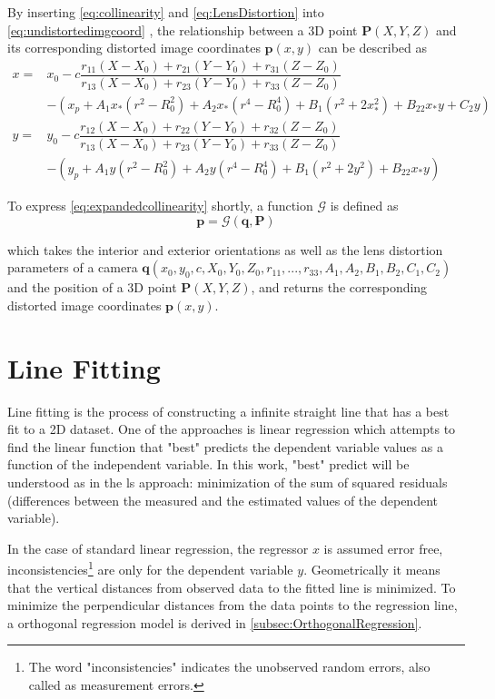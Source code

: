 By inserting \eqref{eq:collinearity} and \eqref{eq:LensDistortion} into \eqref{eq:undistortedimgcoord} , the relationship between a 3D point $\mathbf{P}(X, Y, Z)$ and its corresponding distorted image coordinates $\mathbf{p}(x,y)$ can be described as
\begin{equation} \label{eq:expandedcollinearity}
\begin{split}
x =& x_0-c\dfrac{r_{11}(X-X_0)+r_{21}(Y-Y_0)+r_{31}(Z-Z_0)}{r_{13}(X-X_0)+r_{23}(Y-Y_0)+r_{33}(Z-Z_0)} \\
&-(x_p + A_1x_*(r^2-R_0^2) + A_2x_*(r^4-R_0^4) + B_1(r^2+2x_*^2) + B_22x_*y+C_2y)\\
y =& y_0-c\dfrac{r_{12}(X-X_0)+r_{22}(Y-Y_0)+r_{32}(Z-Z_0)}{r_{13}(X-X_0)+r_{23}(Y-Y_0)+r_{33}(Z-Z_0)} \\
&-(y_p + A_1y  (r^2-R_0^2) + A_2y  (r^4-R_0^4) + B_1(r^2+2y^2)   + B_22x_*y)
\end{split}
\end{equation}

To express \eqref{eq:expandedcollinearity} shortly, a function $\mathcal{G}$ is defined as
\begin{equation} \label{eq:Gfunction}
\mathbf{p} = \mathcal{G}(\mathbf{q},\mathbf{P}) 
\end{equation}

which takes the interior and exterior orientations as well as the lens distortion parameters of a camera $\mathbf{q}(x_0,y_0,c,X_0,Y_0,Z_0,r_{11},...,r_{33},A_1,A_2,B_1,B_2,C_1,C_2)$ and the position of a 3D point $\mathbf{P}(X, Y, Z)$, and returns the corresponding distorted image coordinates $\mathbf{p}(x,y)$.


\section{Line Fitting}
\label{sec:LineFitting}

Line fitting is the process of constructing a infinite straight line that has a best fit to a 2D dataset. One of the approaches is linear regression which attempts to find the linear function that "best" predicts the dependent variable values as a function of the independent variable. In this work, "best" predict will be understood as in the \gls{ls} approach: minimization of the sum of squared residuals (differences between the measured and the estimated values of the dependent variable).

In the case of standard linear regression, the regressor $x$ is assumed error free, inconsistencies\footnote{The word "inconsistencies" indicates the unobserved random errors, also called as measurement errors.} are only for the dependent variable $y$. Geometrically it means that the vertical distances from observed data to the fitted line is minimized. To minimize the perpendicular distances from the data points to the regression line, a orthogonal regression model is derived in \cref{subsec:OrthogonalRegression}.

